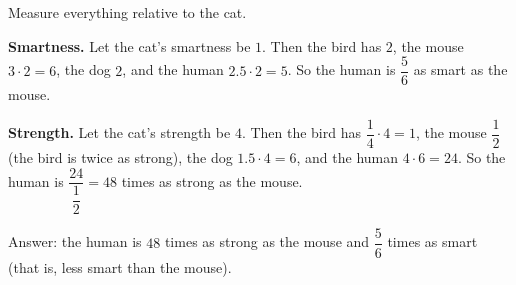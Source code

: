 Measure everything relative to the cat.

\textbf{Smartness.} Let the cat's smartness be $1$. Then the bird has $2$, the mouse $3\cdot2=6$, the dog $2$, and the human $2.5\cdot2=5$. So the human is $\dfrac{5}{6}$ as smart as the mouse.

\textbf{Strength.} Let the cat's strength be $4$. Then the bird has $\dfrac{1}{4}\cdot4=1$, the mouse $\dfrac{1}{2}$ (the bird is twice as strong), the dog $1.5\cdot4=6$, and the human $4\cdot6=24$. So the human is $\dfrac{24}{\dfrac{1}{2}}=48$ times as strong as the mouse.

Answer: the human is $\boxed{48}$ times as strong as the mouse and $\boxed{\dfrac{5}{6}}$ times as smart (that is, less smart than the mouse).
